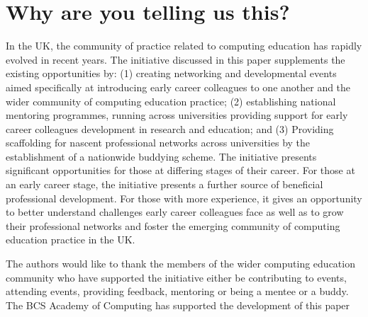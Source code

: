\documentclass[sigconf]{acmart}
\begin{document}
\section{Why are you telling us this?}
 In the UK, the community of practice related to computing education has rapidly evolved in recent years. The initiative discussed in this paper supplements the existing opportunities by: (1) creating networking and developmental events aimed specifically at introducing early career colleagues to one another and the wider community of computing education practice; (2) establishing national mentoring programmes, running across universities providing support for early career colleagues development in research and education; and (3) Providing scaffolding for nascent professional networks across universities by the establishment of a nationwide buddying scheme. The initiative presents significant opportunities for those at differing stages of their career.  For those at an early career stage, the initiative presents a further source of beneficial professional development. For those with more experience, it gives an opportunity to better understand challenges early career colleagues face as well as to grow their professional networks and foster the emerging community of computing education practice in the UK. 

\begin{acks}
	
	The authors would like to thank the members of the wider computing education community who have supported the initiative either be contributing to events, attending events, providing feedback, mentoring or being a mentee or a buddy.
	The BCS Academy of Computing has supported the development of this paper
	
	
\end{acks}




\end{document}
